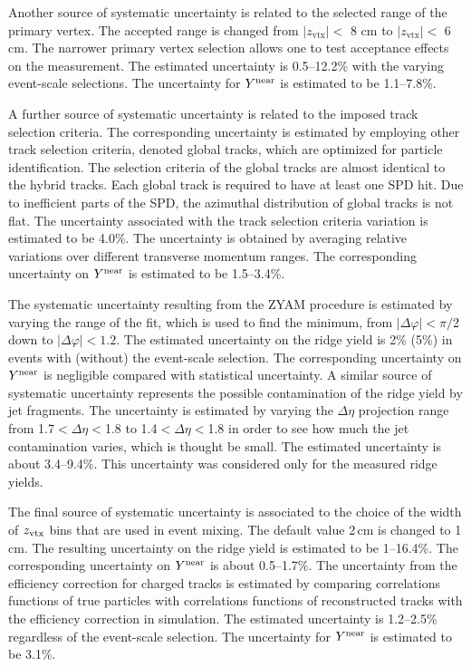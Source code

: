 Another source of systematic uncertainty is related to the selected range of the primary vertex. The accepted range is changed from $|z_\mathrm{vtx}|<$ 8 cm to $|z_\mathrm{vtx}|<$ 6 cm. The narrower primary vertex selection allows one to test acceptance effects on the measurement. The estimated uncertainty is 0.5--12.2\% with the varying event-scale selections. The uncertainty for $Y^{\rm{near}}$ is estimated to be 1.1--7.8\%.

A further source of systematic uncertainty is related to the imposed track selection criteria. The corresponding uncertainty is estimated by employing other track selection criteria, denoted global tracks, which are optimized for particle identification. The selection criteria of the global tracks are almost identical to the hybrid tracks. Each global track is required to have at least one SPD hit. 
Due to inefficient parts of the SPD, the azimuthal distribution of global tracks is not flat.
The uncertainty associated with the track selection criteria variation is estimated to be 4.0\%. The uncertainty is obtained by averaging relative variations over different transverse momentum ranges. The corresponding uncertainty on $Y^{\rm{near}}$ is estimated to be 1.5--3.4\%.

The systematic uncertainty resulting from the ZYAM procedure is estimated by varying the range of the fit, which is used to find the minimum, from $|\Delta\varphi|<\pi/$2 down to $|\Delta\varphi|<1.2$. The estimated uncertainty on the ridge yield is 2\% (5\%) in events with (without) the event-scale selection. The corresponding uncertainty on $Y^{\rm{near}}$ is negligible compared with statistical uncertainty. A similar source of systematic uncertainty represents the possible contamination of the ridge yield by jet fragments. The uncertainty is estimated by varying the $\Delta\eta$ projection range from 1.7$<\Delta\eta<$1.8 to 1.4$<\Delta\eta<$1.8 in order to see how much the jet contamination varies, which is thought be small. The estimated uncertainty is about 3.4--9.4\%. This uncertainty was considered only for the measured ridge yields.


The final source of systematic uncertainty is associated to the choice of the width of $z_{\rm vtx}$ bins that are used in event mixing. The default value 2\,cm is changed to 1\,cm. The resulting uncertainty on the ridge yield is estimated to be 1--16.4\%.
The corresponding uncertainty on $Y^{\rm{near}}$ is about 0.5--1.7\%. The uncertainty from the efficiency correction for charged tracks is estimated by comparing correlations functions of true particles with correlations functions of reconstructed tracks with the efficiency correction in simulation. The estimated uncertainty is 1.2--2.5\% regardless of the event-scale selection. The uncertainty for $Y^{\rm{near}}$ is estimated to be 3.1\%.

